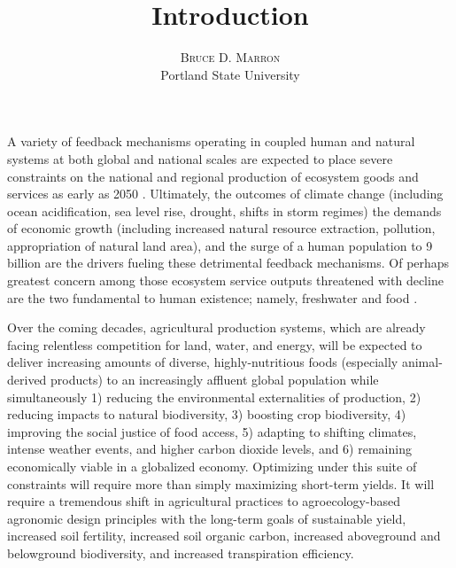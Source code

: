 \documentclass[twoside]{article}	%
\title{\vspace{-15mm}\fontsize{14pt}{10pt}\selectfont\textbf{Introduction}} %
\author{
\large
\textsc{Bruce D. Marron} \\ %
\normalsize Portland State University \\ %
\vspace{-5mm}
}
\date{}
\begin{document}
\maketitle                %
\thispagestyle{fancy}     %





A variety of feedback mechanisms operating in coupled human and natural systems at both global and national scales are expected to place severe constraints on the national and regional production of ecosystem goods and services as early as 2050 \citep{zhao_drought-induced_2010, hoegh-guldberg_impact_2010, eigenbrod_impact_2011}. Ultimately, the outcomes of climate change (including ocean acidification, sea level rise, drought, shifts in storm regimes) the demands of economic growth (including increased natural resource extraction, pollution, appropriation of natural land area), and the surge of a human population to 9 billion are the drivers fueling these detrimental feedback mechanisms. Of perhaps greatest concern among those ecosystem service outputs threatened with decline are the two fundamental to human existence; namely, freshwater and food \citep{dodds_human_2013, rogers_facing_2008, lobell_climate_2011, wada_global_2010, zhao_drought-induced_2010, schmidhuber_global_2007, tilman_forecasting_2001, tilman_agricultural_2002}. 

Over the coming decades, agricultural production systems, which are already facing relentless competition for land, water, and energy, will be expected to deliver increasing amounts of diverse, highly-nutritious foods (especially animal-derived products) to an increasingly affluent global population while simultaneously 1) reducing the environmental externalities of production, 2) reducing impacts to natural biodiversity, 3) boosting crop biodiversity, 4) improving the social justice of food access, 5) adapting to shifting climates, intense weather events, and higher carbon dioxide levels, and 6) remaining economically viable in a globalized economy. Optimizing under this suite of constraints will require more than simply maximizing short-term yields. It will require a tremendous shift in agricultural practices to agroecology-based agronomic design principles with the long-term goals of sustainable yield, increased soil fertility, increased soil organic carbon, increased aboveground and belowground biodiversity, and increased transpiration efficiency.
\end{document}
